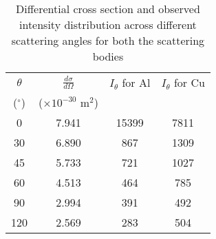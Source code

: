 \begin{table}[H]
    \centering
    \begin{tabular}{|c|c|c|c|}
    \hline
    $\theta$ & $\frac{d\sigma}{d\Omega}$ & $I_\theta$ for Al & $I_\theta$ for Cu \\
    ($^\circ$) & ($\times 10^{-30}$ m$^2$) &  &  \\ \hline
    0 & 7.941 & 15399 & 7811 \\ \hline
    30 & 6.890 & 867 & 1309 \\ \hline
    45 & 5.733 & 721 & 1027 \\ \hline
    60 & 4.513 & 464 & 785 \\ \hline
    90 & 2.994 & 391 & 492 \\ \hline
    120 & 2.569 & 283 & 504 \\ \hline
    \end{tabular}
    \caption{Differential cross section and observed intensity distribution across different scattering angles for both the scattering bodies}
    \label{tab:3}
\end{table}